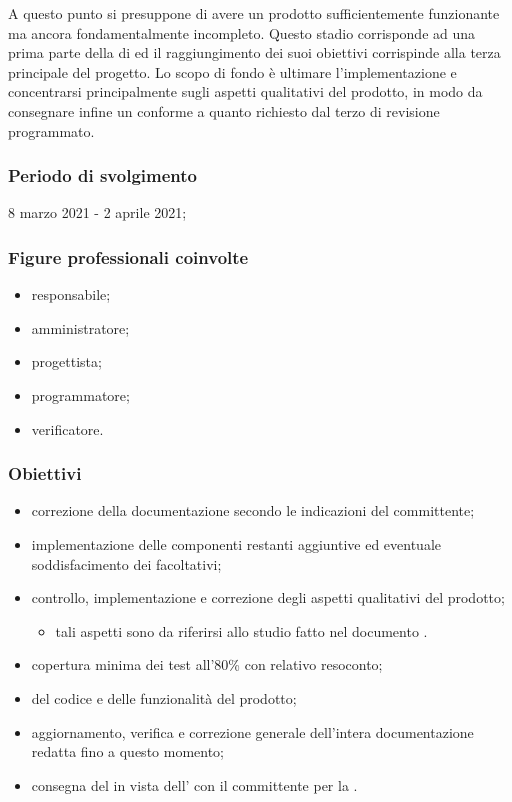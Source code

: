 A questo punto si presuppone di avere un prodotto sufficientemente funzionante ma ancora fondamentalmente incompleto. Questo stadio corrisponde ad una prima parte della  di  ed il raggiungimento dei suoi obiettivi corrispinde alla terza  principale del progetto. Lo scopo di fondo è ultimare l'implementazione e concentrarsi principalmente sugli aspetti qualitativi del prodotto, in modo da consegnare infine un  conforme a quanto richiesto dal terzo  di revisione programmato.
        
        \subsubsection{Periodo di svolgimento}
        8 marzo 2021 - 2 aprile 2021;
        
        \subsubsection{Figure professionali coinvolte}
            \begin{itemize}
                \item responsabile;
                \item amministratore;
                \item progettista;
                \item programmatore;
                \item verificatore.
            \end{itemize}

        \subsubsection{Obiettivi}
        \begin{itemize}
            \item correzione della documentazione secondo le indicazioni del committente;
            \item implementazione delle componenti restanti aggiuntive ed eventuale soddisfacimento dei  facoltativi;
            \item controllo, implementazione e correzione degli aspetti qualitativi del prodotto;
            \begin{itemize}
                \item tali aspetti sono da riferirsi allo studio fatto nel documento \PdQ{}. %
            \end{itemize}
            \item copertura minima dei test all'80\% con relativo resoconto;
            \item {} del codice e delle funzionalità del prodotto;
            \item aggiornamento, verifica e correzione generale dell'intera documentazione redatta fino a questo momento;
            \item consegna del  in vista dell' con il committente per la \RQ{}.
        \end{itemize}